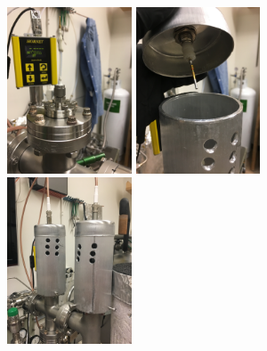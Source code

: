 \begin{figure}[htbp]
\includegraphics[width=0.33\textwidth, angle=-90]{figures/testbed/ft6_4.jpg}
\includegraphics[width=0.33\textwidth, angle=-90]{figures/testbed/ft6_5.jpg}  
\includegraphics[width=0.33\textwidth, angle=-90]{figures/testbed/ft6_6.jpg}\\      
    

\end{figure}
